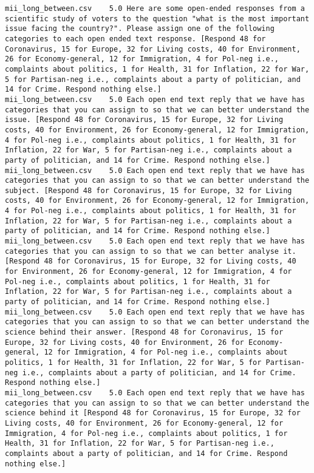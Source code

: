 \begin{lstlisting}
mii_long_between.csv	5.0	Here are some open-ended responses from a scientific study of voters to the question "what is the most important issue facing the country?". Please assign one of the following categories to each open ended text response. [Respond 48 for Coronavirus, 15 for Europe, 32 for Living costs, 40 for Environment, 26 for Economy-general, 12 for Immigration, 4 for Pol-neg i.e., complaints about politics, 1 for Health, 31 for Inflation, 22 for War, 5 for Partisan-neg i.e., complaints about a party of politician, and 14 for Crime. Respond nothing else.]
mii_long_between.csv	5.0	Each open end text reply that we have has categories that you can assign to so that we can better understand the issue. [Respond 48 for Coronavirus, 15 for Europe, 32 for Living costs, 40 for Environment, 26 for Economy-general, 12 for Immigration, 4 for Pol-neg i.e., complaints about politics, 1 for Health, 31 for Inflation, 22 for War, 5 for Partisan-neg i.e., complaints about a party of politician, and 14 for Crime. Respond nothing else.]
mii_long_between.csv	5.0	Each open end text reply that we have has categories that you can assign to so that we can better understand the subject. [Respond 48 for Coronavirus, 15 for Europe, 32 for Living costs, 40 for Environment, 26 for Economy-general, 12 for Immigration, 4 for Pol-neg i.e., complaints about politics, 1 for Health, 31 for Inflation, 22 for War, 5 for Partisan-neg i.e., complaints about a party of politician, and 14 for Crime. Respond nothing else.]
mii_long_between.csv	5.0	Each open end text reply that we have has categories that you can assign to so that we can better analyse it. [Respond 48 for Coronavirus, 15 for Europe, 32 for Living costs, 40 for Environment, 26 for Economy-general, 12 for Immigration, 4 for Pol-neg i.e., complaints about politics, 1 for Health, 31 for Inflation, 22 for War, 5 for Partisan-neg i.e., complaints about a party of politician, and 14 for Crime. Respond nothing else.]
mii_long_between.csv	5.0	Each open end text reply that we have has categories that you can assign to so that we can better understand the science behind their answer. [Respond 48 for Coronavirus, 15 for Europe, 32 for Living costs, 40 for Environment, 26 for Economy-general, 12 for Immigration, 4 for Pol-neg i.e., complaints about politics, 1 for Health, 31 for Inflation, 22 for War, 5 for Partisan-neg i.e., complaints about a party of politician, and 14 for Crime. Respond nothing else.]
mii_long_between.csv	5.0	Each open end text reply that we have has categories that you can assign to so that we can better understand the science behind it [Respond 48 for Coronavirus, 15 for Europe, 32 for Living costs, 40 for Environment, 26 for Economy-general, 12 for Immigration, 4 for Pol-neg i.e., complaints about politics, 1 for Health, 31 for Inflation, 22 for War, 5 for Partisan-neg i.e., complaints about a party of politician, and 14 for Crime. Respond nothing else.]

\end{lstlisting}
